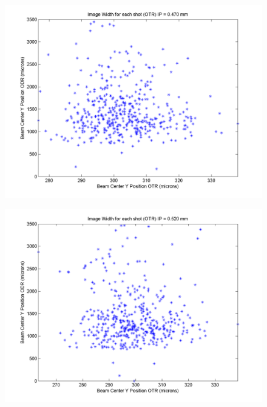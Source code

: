 \documentclass[12pt]{article}
\begin{document}
\begin{figure}
\begin{center}
\includegraphics[scale=0.5]{Figures/YPosition_OTRODR_470.PNG}
\caption{}
\end{center}
\end{figure}

\begin{figure}
\begin{center}
\includegraphics[scale=0.5]{Figures/YPosition_OTRODR_520.PNG}
\caption{}
\end{center}
\end{figure}
\end{document}
